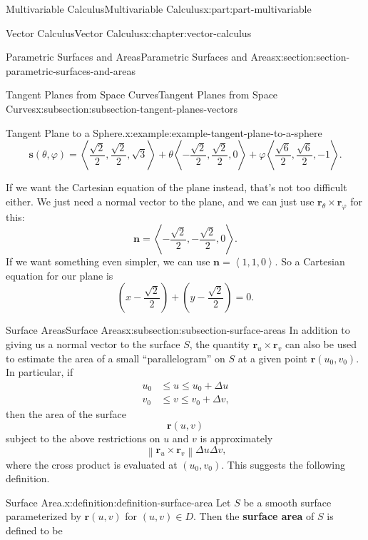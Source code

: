 \documentclass[twoside,10pt,]{book}
\newcommand{\terminology}[1]{\textbf{#1}}
\numberwithin{equation}{part}
\newcommand{\vb}[1]{\mathbf{#1}}
\newcommand{\norm}[1]{\left\| #1 \right\|}
\newcommand{\dotprod}[1]{\left\langle #1 \right\rangle}
\newcommand{\parens}[1]{\left( #1 \right)}
\newcommand{\amp}{&}
\begin{document}
\begin{partptx}{Multivariable Calculus}{}{Multivariable Calculus}{}{}{x:part:part-multivariable}
\begin{chapterptx}{Vector Calculus}{}{Vector Calculus}{}{}{x:chapter:vector-calculus}
\begin{sectionptx}{Parametric Surfaces and Areas}{}{Parametric Surfaces and Areas}{}{}{x:section:section-parametric-surfaces-and-areas}
\begin{subsectionptx}{Tangent Planes from Space Curves}{}{Tangent Planes from Space Curves}{}{}{x:subsection:subsection-tangent-planes-vectors}
\begin{example}{Tangent Plane to a Sphere.}{x:example:example-tangent-plane-to-a-sphere}
\begin{equation*}
\vb{s}(\theta,\varphi) = \dotprod{\frac{\sqrt{2}}{2}, \frac{\sqrt{2}}{2}, \sqrt{3}} + \theta\dotprod{-\frac{\sqrt{2}}{2}, \frac{\sqrt{2}}{2}, 0} + \varphi\dotprod{\frac{\sqrt{6}}{2}, \frac{\sqrt{6}}{2}, -1}\text{.}
\end{equation*}
%
\par
If we want the Cartesian equation of the plane instead, that's not too difficult either. We just need a normal vector to the plane, and we can just use \(\vb{r}_{\theta}\times\vb{r}_{\varphi}\) for this:%
\begin{equation*}
\vb{n} = \dotprod{-\frac{\sqrt{2}}{2}, -\frac{\sqrt{2}}{2},0}\text{.}
\end{equation*}
If we want something even simpler, we can use \(\vb{n} = \dotprod{1,1,0}\). So a Cartesian equation for our plane is%
\begin{equation*}
\parens{x -\frac{\sqrt{2}}{2}} + \parens{y-\frac{\sqrt{2}}{2}} = 0\text{.}
\end{equation*}
%
\end{example}
\end{subsectionptx}
%
%
\typeout{************************************************}
\typeout{************************************************}
%
\begin{subsectionptx}{Surface Areas}{}{Surface Areas}{}{}{x:subsection:subsection-surface-areas}
In addition to giving us a normal vector to the surface \(S\), the quantity \(\vb{r}_{u}\times\vb{r}_{v}\) can also be used to estimate the area of a small ``parallelogram'' on \(S\) at a given point \(\vb{r}(u_{0}, v_{0})\). In particular, if%
\begin{align*}
u_{0} \amp \leq u\leq u_{0} + \Delta u \\
v_{0} \amp \leq v\leq v_{0} + \Delta v \text{,}
\end{align*}
then the area of the surface%
\begin{equation*}
\vb{r}(u,v)
\end{equation*}
subject to the above restrictions on \(u\) and \(v\) is approximately%
\begin{equation*}
\norm{\vb{r}_{u}\times\vb{r}_{v}}\Delta u\Delta v\text{,}
\end{equation*}
where the cross product is evaluated at \((u_{0}, v_{0})\). This suggests the following definition.%
\begin{definition}{Surface Area.}{x:definition:definition-surface-area}%
%
Let \(S\) be a smooth surface parameterized by \(\vb{r}(u,v)\) for \((u,v)\in D\). Then the \terminology{surface area} of \(S\) is defined to be%

\end{definition}
\end{subsectionptx}
\end{sectionptx}
\end{chapterptx}
\end{partptx}
\end{document}
